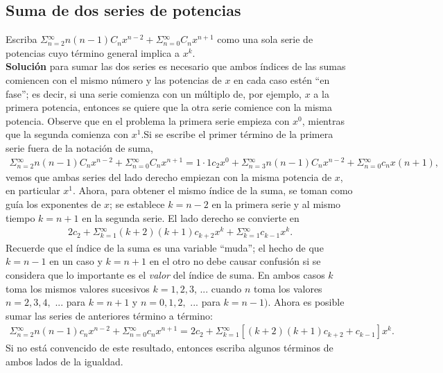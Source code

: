 \documentclass[12pt,letterpaper,oneside]{article}
\begin{document}
\subsection{Suma de dos series de potencias }
Escriba $\Sigma{^\infty_{n=2}} n(n-1)C_nx^{n-2} + \Sigma{^\infty_{n=0}} C_nx^{n+1}$ como una sola serie de potencias cuyo término general implica a $x^k$.\vspace{0.3cm}\\
\textbf{Solución} para sumar las dos series es necesario que ambos índices de las sumas comiencen con el mismo número y las potencias de $x$ en cada caso estén “en fase”; es decir, si una serie comienza con un múltiplo de, por ejemplo, $x$ a la primera potencia, entonces se quiere que la otra serie comience con la misma potencia. Observe que en el problema la primera serie empieza con $x^0$, mientras que la segunda comienza con $x^1$.Si se escribe el primer término de la primera serie fuera de la notación de suma,\\
\begin{align*}
\Sigma{^\infty_{n=2}} n(n-1)C_nx^{n-2} + \Sigma{^\infty_{n=0}} C_nx^{n+1} = 1\cdot 1c_2x^0 + \Sigma{^\infty_{n=3}} n(n-1)C_nx^{n-2} + \Sigma{^\infty_{n=0}} c_nx(n+1),
\end{align*}
vemos que ambas series del lado derecho empiezan con la misma potencia de $x$, en particular $x^1$. Ahora, para obtener el mismo índice de la suma, se toman como guía los exponentes de $x$; se establece $k = n - 2$ en la primera serie y al mismo tiempo $k = n + 1$ en la segunda serie. El lado derecho se convierte en\\
\begin{align*}
2c_2 + \Sigma{^\infty_{k=1}} (k + 2)(k + 1) c_{k+2}x^k + \Sigma{^\infty_{k=1}} c_{k-1}x^k.
\end{align*}
Recuerde que el índice de la suma es una variable “muda”; el hecho de que $k = n - 1$ en un caso y $k = n + 1$ en el otro no debe causar confusión si se considera que lo importante es el \textit{valor} del índice de suma. En ambos casos $k$ toma los mismos valores sucesivos $k = 1, 2, 3$, ... cuando $n$ toma los valores $n = 2, 3, 4,$ ... para $k = n + 1$ y $n = 0, 1, 2,$ ... para $k = n - 1)$. Ahora es posible sumar las series de anteriores término a término:
\begin{align*}
\Sigma{^\infty_{n=2}} n(n-1)c_nx^{n-2} + \Sigma{^\infty_{n=0}} c_nx^{n+1} = 2c_2 + \Sigma{^\infty_{k=1}} [(k+2)(k+1) c_{k+2} + c_{k-1}]x^k.
\end{align*}
Si no está convencido de este resultado, entonces escriba algunos términos de ambos lados de la igualdad.\vspace{0.3cm}\\
\end{document}
